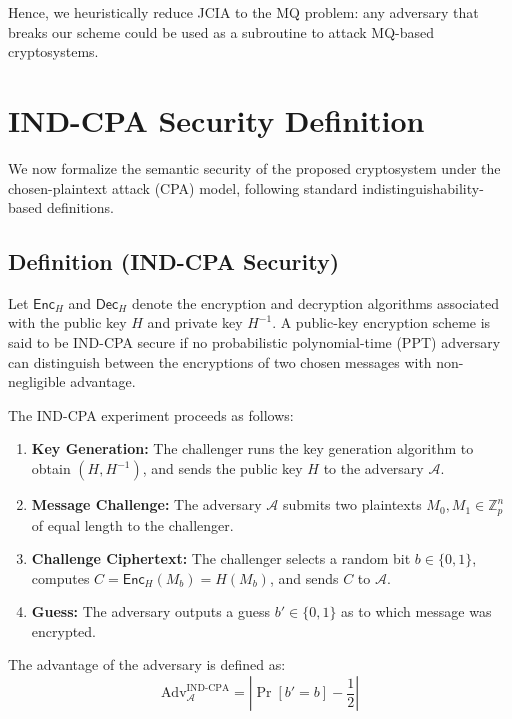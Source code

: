\documentclass[12pt]{article}
\begin{document}
Hence, we heuristically reduce JCIA to the MQ problem: any adversary that breaks our scheme could be used as a subroutine to attack MQ-based cryptosystems.


\section{IND-CPA Security Definition}

We now formalize the semantic security of the proposed cryptosystem under the chosen-plaintext attack (CPA) model, following standard indistinguishability-based definitions.

\subsection*{Definition (IND-CPA Security)}

Let \( \mathsf{Enc}_H \) and \( \mathsf{Dec}_H \) denote the encryption and decryption algorithms associated with the public key \( H \) and private key \( H^{-1} \). A public-key encryption scheme is said to be IND-CPA secure if no probabilistic polynomial-time (PPT) adversary can distinguish between the encryptions of two chosen messages with non-negligible advantage.

The IND-CPA experiment proceeds as follows:

\begin{enumerate}
    \item \textbf{Key Generation:} The challenger runs the key generation algorithm to obtain \( (H, H^{-1}) \), and sends the public key \( H \) to the adversary \( \mathcal{A} \).
    
    \item \textbf{Message Challenge:} The adversary \( \mathcal{A} \) submits two plaintexts \( M_0, M_1 \in \mathbb{Z}_p^n \) of equal length to the challenger.
    
    \item \textbf{Challenge Ciphertext:} The challenger selects a random bit \( b \in \{0,1\} \), computes \( C = \mathsf{Enc}_H(M_b) = H(M_b) \), and sends \( C \) to \( \mathcal{A} \).
    
    \item \textbf{Guess:} The adversary outputs a guess \( b' \in \{0,1\} \) as to which message was encrypted.
\end{enumerate}

The advantage of the adversary is defined as:
\[
\text{Adv}_{\mathcal{A}}^{\text{IND-CPA}} = \left| \Pr[b' = b] - \frac{1}{2} \right|
\]
\end{document}
